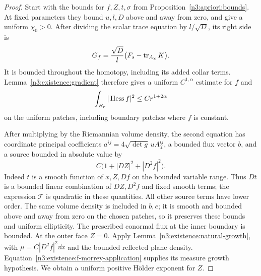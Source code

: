 \begin{proof}
Start with the bounds for $f,Z,t,\sigma$ from
Proposition~\ref{n3:apriori:bounds}.
At fixed parameters they bound $u,l,D$ above and away from zero,
and give a uniform $\chi_0>0$.  After dividing the scalar trace
equation by $l/\sqrt D$, its right side is
\begin{equation}\label{n3:existence:normalized-f-source}
 G_f=\frac{\sqrt D}{l}
         \bigl(F_s-\operatorname{tr}_{A_\chi}K\bigr).
\end{equation}
It is bounded throughout the homotopy, including its added collar
terms.  Lemma~\ref{n3:existence:gradient} therefore gives a uniform
$C^{1,\alpha}$ estimate for $f$ and
\begin{equation}\label{n3:existence:f-morrey-application}
 \int_{B_r}|\operatorname{Hess} f|^2\le Cr^{1+2\alpha}
\end{equation}
on the uniform patches, including boundary patches where $f$ is
constant.

After multiplying by the Riemannian volume density, the second
equation has coordinate principal coefficients
$a^{ij}=4\sqrt{\det g}\,uA_\chi^{ij}$, a bounded flux vector $b$, and a source
bounded in absolute value by
\begin{equation}\label{n3:existence:Z-quadratic-source}
 C\bigl(1+|DZ|^2+|D^2f|^2\bigr).
\end{equation}
Indeed $t$ is a smooth function of $x,Z,Df$ on the bounded variable
range.  Thus $Dt$ is a bounded linear combination of $DZ,D^2f$
and fixed smooth terms; the expression $\mathcal T$ is quadratic
in these quantities.  All other source terms have lower order.
The same volume density is included in $b,e$; it is smooth and bounded
above and away from zero on the chosen patches, so it preserves these
bounds and uniform ellipticity.  The prescribed conormal flux at the inner boundary is
bounded.  At the outer face $Z=0$.
Apply Lemma~\ref{n3:existence:natural-growth}, with
$\mu=C|D^2f|^2\dd x$ and the bounded reflected plane density.
Equation~\eqref{n3:existence:f-morrey-application} supplies its measure
growth hypothesis.  We obtain a uniform positive H\"older exponent
for $Z$.


\end{proof}
